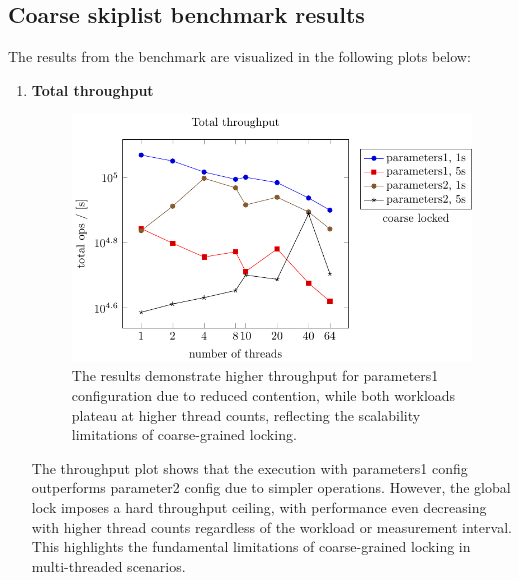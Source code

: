 \documentclass{article}
\begin{document}
\subsection{Coarse skiplist benchmark results}

The results from the benchmark are visualized in the following plots below:
\begin{enumerate}
    \item \textbf{Total throughput}
    \begin{figure}[H]
        \centering
        \includegraphics{../plots/coarse_throughput.pdf}
        \caption{ The results demonstrate higher throughput for parameters1 configuration due to reduced contention, while both workloads plateau at higher thread counts, reflecting the scalability limitations of coarse-grained locking.}
       
        \label{fig:coarse_skiplist_throughput}
    \end{figure}
The throughput plot shows that the execution with parameters1 config outperforms parameter2 config due to simpler operations. However, the global lock imposes a hard throughput ceiling, with performance even decreasing with higher thread counts regardless of the workload or measurement interval. This highlights the fundamental limitations of coarse-grained locking in multi-threaded scenarios.


\end{enumerate}
\end{document}
